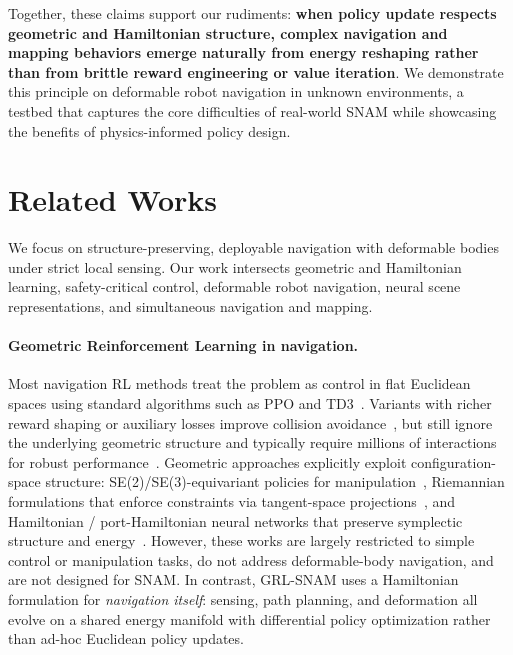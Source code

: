 \documentclass{article} %
\begin{document}
Together, these claims support our rudiments: \textbf{when policy update respects geometric and Hamiltonian structure, complex navigation and mapping behaviors emerge naturally from energy reshaping rather than from brittle reward engineering or value iteration}. We demonstrate this principle on deformable robot navigation in unknown environments, a testbed that captures the core difficulties of real-world SNAM while showcasing the benefits of physics-informed policy design.






\section{Related Works}

We focus on structure-preserving, deployable navigation with deformable bodies under strict local sensing. Our work intersects geometric and Hamiltonian learning, safety-critical control, deformable robot navigation, neural scene representations, and simultaneous navigation and mapping.

\paragraph{Geometric Reinforcement Learning in navigation.}
Most navigation RL methods treat the problem as control in flat Euclidean spaces using standard algorithms such as PPO and TD3~\citep{schulman2017ppo,fujimoto2018td3}. Variants with richer reward shaping or auxiliary losses improve collision avoidance~\citep{taheri2024enhanced}, but still ignore the underlying geometric structure and typically require millions of interactions for robust performance~\citep{dehghani2024survey}. Geometric approaches explicitly exploit configuration-space structure: SE(2)/SE(3)-equivariant policies for manipulation~\citep{hoang2025geometry}, Riemannian formulations that enforce constraints via tangent-space projections~\citep{martinez2023accelerated, riemannian2023safe}, and Hamiltonian / port-Hamiltonian neural networks that preserve symplectic structure and energy~\citep{aps2021port}. However, these works are largely restricted to simple control or manipulation tasks, do not address deformable-body navigation, and are not designed for SNAM. In contrast, GRL-SNAM uses a Hamiltonian formulation for \emph{navigation itself}: sensing, path planning, and deformation all evolve on a shared energy manifold with differential policy optimization rather than ad-hoc Euclidean policy updates. 
\end{document}
